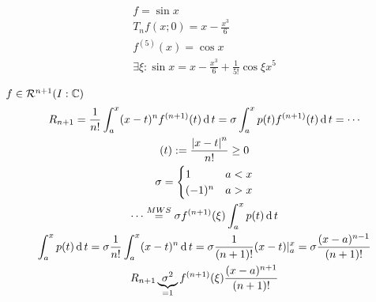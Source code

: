 \begin{Bsp}
  \begin{gather*}
    f=\sin x\\
    T_n f(x;0)=x-\frac{x^3}{6}\\
    f^{(5)}(x)=\cos x\\
    \exists \xi: \sin x=x-\frac{x^3}{6}+\frac{1}{5!}\cos\xi x^5
  \end{gather*}
\end{Bsp}
\begin{Bew}
  $f\in \mathcal{R}^{n+1}(I:\mathbb{C})$
  \begin{gather*}
    R_{n+1}=\frac{1}{n!}\int^x_a (x-t)^nf^{(n+1)}(t)\operatorname{d} t = \sigma\int^x_ap(t)f^{(n+1)}(t)\operatorname{d} t = \cdots\\
    (t):=\frac{\left| x-t \right|^n}{n!}\geq 0\\
    \sigma =\begin{cases}
      1&a<x\\
      (-1)^n&a>x
    \end{cases}\\
    \cdots \stackrel{MWS}{=} \sigma f^{(n+1)}(\xi)\int^x_ap(t)\operatorname{d} t\\
    \int^x_ap(t)\operatorname{d} t=\sigma\frac{1}{n!}\int^x_a(x-t)^n\operatorname{d} t=\sigma\frac{1}{(n+1)!}(x-t)|^x_a=\sigma\frac{(x-a)^{n-1}}{(n+1)!}\\
    R_{n+1}\underbrace{\sigma^2}_{=1}f^{(n+1)}(\xi)\frac{(x-a)^{n+1}}{(n+1)!}
  \end{gather*}
\end{Bew}
